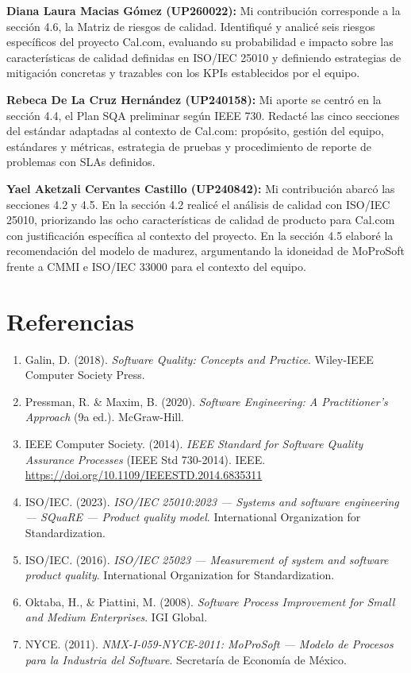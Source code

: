 \documentclass{article}
\begin{document}
\textbf{Diana Laura Macias Gómez (UP260022):} Mi contribución corresponde a la sección 4.6, la Matriz de riesgos de calidad. Identifiqué y analicé seis riesgos específicos del proyecto Cal.com, evaluando su probabilidad e impacto sobre las características de calidad definidas en ISO/IEC 25010 y definiendo estrategias de mitigación concretas y trazables con los KPIs establecidos por el equipo.

\textbf{Rebeca De La Cruz Hernández (UP240158):} Mi aporte se centró en la sección 4.4, el Plan SQA preliminar según IEEE 730. Redacté las cinco secciones del estándar adaptadas al contexto de Cal.com: propósito, gestión del equipo, estándares y métricas, estrategia de pruebas y procedimiento de reporte de problemas con SLAs definidos.

\textbf{Yael Aketzali Cervantes Castillo (UP240842):} Mi contribución abarcó las secciones 4.2 y 4.5. En la sección 4.2 realicé el análisis de calidad con ISO/IEC 25010, priorizando las ocho características de calidad de producto para Cal.com con justificación específica al contexto del proyecto. En la sección 4.5 elaboré la recomendación del modelo de madurez, argumentando la idoneidad de MoProSoft frente a CMMI e ISO/IEC 33000 para el contexto del equipo.

\newpage
\section*{Referencias}
\begin{enumerate}
    \item Galin, D. (2018). \textit{Software Quality: Concepts and Practice}. Wiley-IEEE Computer Society Press.
    \item Pressman, R. \& Maxim, B. (2020). \textit{Software Engineering: A Practitioner's Approach} (9a ed.). McGraw-Hill.
    \item IEEE Computer Society. (2014). \textit{IEEE Standard for Software Quality Assurance Processes} (IEEE Std 730-2014). IEEE. \url{https://doi.org/10.1109/IEEESTD.2014.6835311}
    \item ISO/IEC. (2023). \textit{ISO/IEC 25010:2023 — Systems and software engineering — SQuaRE — Product quality model}. International Organization for Standardization.
    \item ISO/IEC. (2016). \textit{ISO/IEC 25023 — Measurement of system and software product quality}. International Organization for Standardization.
    \item Oktaba, H., \& Piattini, M. (2008). \textit{Software Process Improvement for Small and Medium Enterprises}. IGI Global.
    \item NYCE. (2011). \textit{NMX-I-059-NYCE-2011: MoProSoft — Modelo de Procesos para la Industria del Software}. Secretaría de Economía de México.
\end{enumerate}
\end{document}
